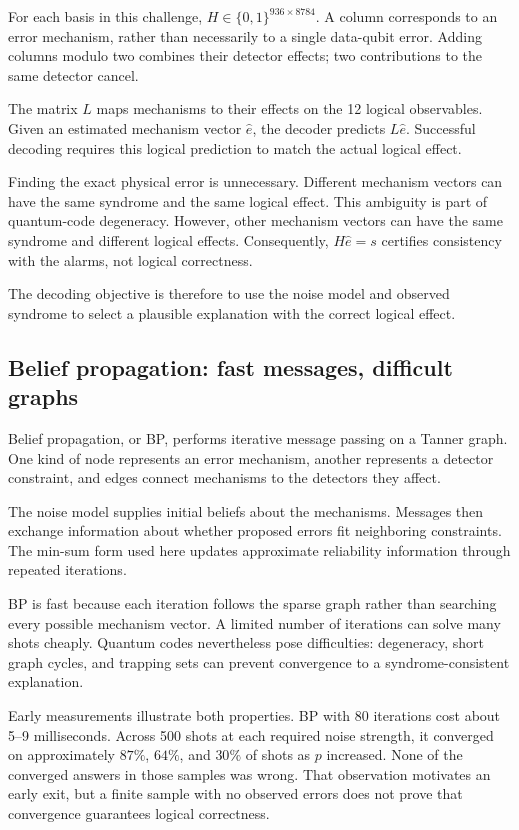 For each basis in this challenge,
$H \in \{0,1\}^{936 \times 8784}$.
A column corresponds to an error mechanism, rather than necessarily to a single data-qubit error. Adding columns modulo two combines their detector effects; two contributions to the same detector cancel.

The matrix $L$ maps mechanisms to their effects on the 12 logical observables. Given an estimated mechanism vector $\hat e$, the decoder predicts $L\hat e$. Successful decoding requires this logical prediction to match the actual logical effect.

Finding the exact physical error is unnecessary. Different mechanism vectors can have the same syndrome and the same logical effect. This ambiguity is part of quantum-code degeneracy. However, other mechanism vectors can have the same syndrome and different logical effects. Consequently, $H\hat e=s$ certifies consistency with the alarms, not logical correctness.

The decoding objective is therefore to use the noise model and observed syndrome to select a plausible explanation with the correct logical effect.

\subsection{Belief propagation: fast messages, difficult graphs}

Belief propagation, or BP, performs iterative message passing on a Tanner graph. One kind of node represents an error mechanism, another represents a detector constraint, and edges connect mechanisms to the detectors they affect.

The noise model supplies initial beliefs about the mechanisms. Messages then exchange information about whether proposed errors fit neighboring constraints. The min-sum form used here updates approximate reliability information through repeated iterations.

BP is fast because each iteration follows the sparse graph rather than searching every possible mechanism vector. A limited number of iterations can solve many shots cheaply. Quantum codes nevertheless pose difficulties: degeneracy, short graph cycles, and trapping sets can prevent convergence to a syndrome-consistent explanation.

Early measurements illustrate both properties. BP with 80 iterations cost about 5--9 milliseconds. Across 500 shots at each required noise strength, it converged on approximately $87\%$, $64\%$, and $30\%$ of shots as $p$ increased. None of the converged answers in those samples was wrong. That observation motivates an early exit, but a finite sample with no observed errors does not prove that convergence guarantees logical correctness.

